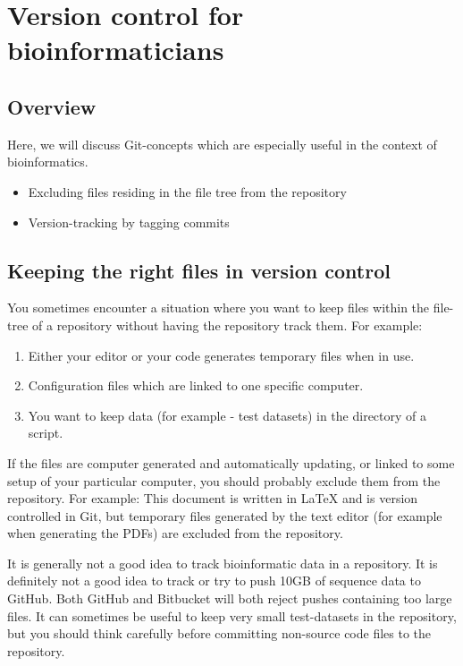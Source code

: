 \documentclass[../main/git_course_main.tex]{subfiles}
\begin{document}
	
	\setcounter{chapter}{5}
	\chapter{Version control for bioinformaticians}
	
	
	\section{Overview}
	
	Here, we will discuss Git-concepts which are especially useful in the
	context of bioinformatics.
	
	\begin{itemize}
		\item Excluding files residing in the file tree from the repository
		\item Version-tracking by tagging commits
	\end{itemize}
	
	\section{Keeping the right files in version control}
	
	You sometimes encounter a situation where you want to keep files within the file-tree of a repository without having the repository track them. For example:
	
	\begin{enumerate}
		\item Either your editor or your code generates temporary files when in use.
		\item Configuration files which are linked to one specific computer.
		\item You want to keep data (for example - test datasets) in the directory of a script.
	\end{enumerate}
	
	If the files are computer generated and automatically updating, or linked to some setup of your particular computer, you should probably exclude them from the repository. For example: This document is written in LaTeX and is version controlled in Git, but temporary files generated by the text editor (for example when generating the PDFs) are excluded from the repository.
	
	It is generally not a good idea to track bioinformatic data in a repository. It is definitely not a good idea to track or try to push 10GB of sequence data to GitHub. Both GitHub and Bitbucket will both reject pushes containing too large files. It can sometimes
	be useful to keep very small test-datasets in the repository, but you should think carefully before committing non-source code files to the repository.
	
\end{document}
